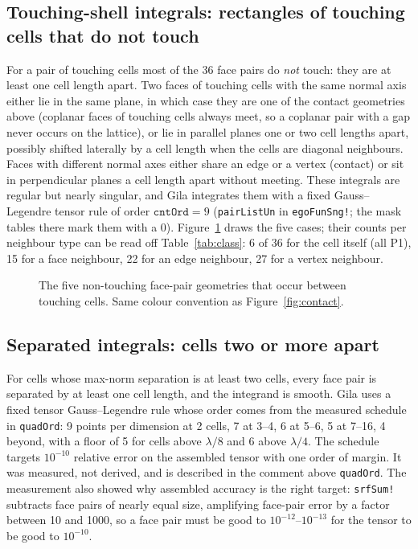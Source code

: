 \documentclass[11pt]{article}
\theoremstyle{remark}
\newcommand{\code}[1]{\texttt{#1}}
\begin{document}
\subsection{Touching-shell integrals: rectangles of touching cells that do not touch}
\label{sec:shell}

For a pair of touching cells most of the 36 face pairs do \emph{not} touch: they are
at least one cell length apart. Two faces of touching cells with the same normal axis
either lie in the same plane, in which case they are one of the contact geometries
above (coplanar faces of touching cells always meet, so a coplanar pair with a gap
never occurs on the lattice), or lie in parallel planes one or two cell lengths apart,
possibly shifted laterally by a cell length when the cells are diagonal neighbours.
Faces with different normal axes either share an edge or a vertex (contact) or sit in
perpendicular planes a cell length apart without meeting. These integrals are regular
but nearly singular, and Gila integrates them with a fixed Gauss--Legendre tensor rule
of order $\code{cntOrd} = 9$ (\code{pairListUn} in \code{egoFunSng!}; the mask tables
there mark them with a $0$). Figure~\ref{fig:shell} draws the five cases; their
counts per neighbour type can be read off Table~\ref{tab:class}: 6 of 36 for the cell
itself (all P1), 15 for a face neighbour, 22 for an edge neighbour, 27 for a vertex
neighbour.

\begin{figure}[htbp]

\caption{The five non-touching face-pair geometries that occur between touching
cells. Same colour convention as Figure~\ref{fig:contact}.}
\label{fig:shell}
\end{figure}

\subsection{Separated integrals: cells two or more apart}

For cells whose max-norm separation is at least two cells, every face pair is
separated by at least one cell length, and the integrand is smooth. Gila uses a fixed
tensor Gauss--Legendre rule whose order comes from the measured schedule in
\code{quadOrd}: 9 points per dimension at 2 cells, 7 at 3--4, 6 at 5--6, 5 at 7--16,
4 beyond, with a floor of 5 for cells above $\lambda/8$ and 6 above $\lambda/4$. The
schedule targets $10^{-10}$ relative error on the assembled tensor with one order of
margin. It was measured, not derived, and is described in the comment above
\code{quadOrd}. The measurement also showed why assembled accuracy is the right
target: \code{srfSum!} subtracts face pairs of nearly equal size, amplifying
face-pair error by a factor between 10 and 1000, so a face pair must be good to
$10^{-12}$--$10^{-13}$ for the tensor to be good to $10^{-10}$.
\end{document}
